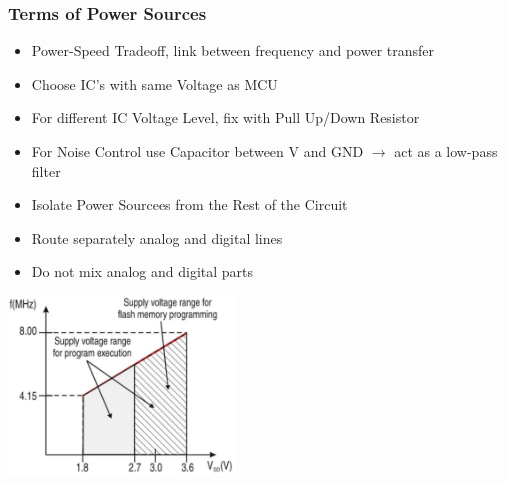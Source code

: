\subsubsection{Terms of Power Sources}
\begin{minipage}{13cm}
	\begin{itemize}
		\item Power-Speed Tradeoff, link between frequency and power transfer
		\item Choose \acs{IC}'s with same Voltage as \acs{MCU}
		\item For different IC Voltage Level, fix with Pull Up/Down Resistor
		\item For Noise Control use Capacitor between V and \acs{GND}
        \subitem  $ \rightarrow $ act as a low-pass filter
		\item Isolate Power Sourcees from the Rest of the Circuit
		\item Route separately analog and digital lines 
		\item Do not mix analog and digital parts
	\end{itemize}
\end{minipage}
\begin{minipage}{5cm}
    \includegraphics[width=6cm]{images/PSTradeoff.png}
\end{minipage}

